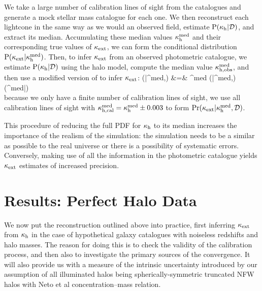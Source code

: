 \documentclass[useAMS,usenatbib,a4paper]{mn2e}
\begin{document}
We  take a large number of
calibration lines of sight from the \MS catalogues and generate a mock
stellar mass catalogue for each one. We then reconstruct each lightcone in the
same way as we would an observed field,
estimate ${\rm P}(\kappa_{\rm h}|{\mathcal{D}})$, and extract its median. Accumulating
these median values $\kappa_{\rm h}^{\rm med}$ and 
their corresponding true values of $\kappa_{\rm ext}$, we can form the 
conditional distribution ${\rm P}(\kappa_{\rm ext}|\kappa_{\rm h}^{\rm med})$. 
Then, to infer $\kappa_{\rm ext}$ from an observed photometric catalogue, we 
estimate ${\rm P}(\kappa_{\rm h}|{\mathcal{D}})$ 
using the halo model, compute the median value 
$\kappa_{\rm h,obs}^{\rm med}$, and then use a modified
version of 
 to infer $\kappa_{\rm ext}$: 
\bea
\Pr(\kappax|\kappah^{\rm med},\data) &=& \int \dee\kappah^{\rm med} 
   \Pr(\kappax|\kappah^{\rm med},\data) \Pr(\kappah^{\rm med}|\data) \notag \\
\label{eq:calkappaconv}   
\eea
{}
because we only have a finite number of calibration lines of sight, we use all
calibration lines of sight with $\kappa_{\rm h,cal}^{\rm med} =
\kappa_{\rm h}^{\rm med}\pm0.003$ to form $\Pr(\kappa_{\rm ext}|\kappa_{\rm h}^{\rm
med},{\mathcal{D}})$.

This procedure of reducing the full PDF for $\kappa_{\rm h}$ to its median increases
the importance of the realism of the simulation: the simulation needs to be a
similar as possible to the real universe or there is a possibility of
systematic errors. Conversely, making use of all the information
in the photometric catalogue yields $\kappa_{\rm ext}$ estimates of increased
precision.


\section{Results: Perfect Halo Data}
\label{sec:knownMh+z} 

We now put the reconstruction \proceedure outlined above into practice, first
inferring $\kappa_{\rm ext}$ from $\kappa_{\rm h}$ in the case of hypothetical galaxy
catalogues with noiseless redshifts and halo masses. The reason for doing this
is to check the validity of the calibration process, and then also to 
investigate the primary sources of the convergence. It will also provide us
with a measure of the intrinsic uncertainty introduced by our assumption of
all illuminated halos being spherically-symmetric truncated NFW halos with
Neto et al concentration--mass relation.
\end{document}
